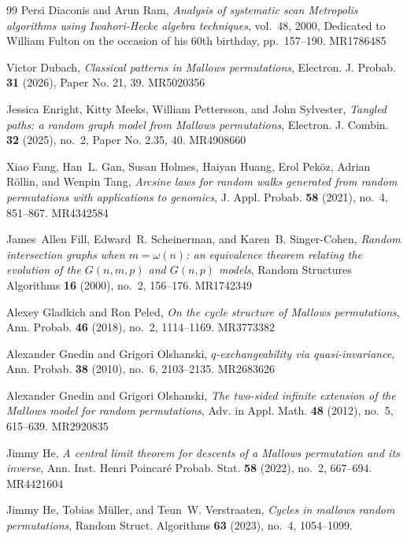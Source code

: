 \documentclass[letterpaper,11pt]{article}
\theoremstyle{definition}
\theoremstyle{remark}
\begin{document}
\begin{thebibliography}{99}
	Persi Diaconis and Arun Ram, \emph{Analysis of systematic scan {M}etropolis
		algorithms using {I}wahori-{H}ecke algebra techniques}, vol.~48, 2000,
	Dedicated to William Fulton on the occasion of his 60th birthday,
	pp.~157--190. MR{1786485}
	
	Victor Dubach, \emph{Classical patterns in {M}allows permutations}, Electron.
	J. Probab. \textbf{31} (2026), Paper No. 21, 39. MR{5020356}
	
	Jessica Enright, Kitty Meeks, William Pettersson, and John Sylvester,
	\emph{Tangled paths: a random graph model from {M}allows permutations},
	Electron. J. Combin. \textbf{32} (2025), no.~2, Paper No. 2.35, 40.
	MR{4908660}
	
	Xiao Fang, Han~L. Gan, Susan Holmes, Haiyan Huang, Erol Pek\"{o}z, Adrian
	R\"{o}llin, and Wenpin Tang, \emph{Arcsine laws for random walks generated
		from random permutations with applications to genomics}, J. Appl. Probab.
	\textbf{58} (2021), no.~4, 851--867. MR{4342584}
	
	James~Allen Fill, Edward~R. Scheinerman, and Karen~B. Singer-Cohen,
	\emph{Random intersection graphs when {$m=\omega(n)$}: an equivalence theorem
		relating the evolution of the {$G(n,m,p)$} and {$G(n,p)$} models}, Random
	Structures Algorithms \textbf{16} (2000), no.~2, 156--176. MR{1742349}
	
	Alexey Gladkich and Ron Peled, \emph{On the cycle structure of {M}allows
		permutations}, Ann. Probab. \textbf{46} (2018), no.~2, 1114--1169.
	MR{3773382}
	
	Alexander Gnedin and Grigori Olshanski, \emph{{$q$}-exchangeability via
		quasi-invariance}, Ann. Probab. \textbf{38} (2010), no.~6, 2103--2135.
	MR{2683626}
	
	Alexander Gnedin and Grigori Olshanski, \emph{The two-sided infinite extension of the {M}allows model for
		random permutations}, Adv. in Appl. Math. \textbf{48} (2012), no.~5,
	615--639. MR{2920835}
	
	Jimmy He, \emph{A central limit theorem for descents of a {M}allows permutation
		and its inverse}, Ann. Inst. Henri Poincar\'{e} Probab. Stat. \textbf{58}
	(2022), no.~2, 667--694. MR{4421604}
	
	Jimmy He, Tobias M{\"{u}}ller, and Teun~W. Verstraaten, \emph{Cycles in mallows
		random permutations}, Random Struct. Algorithms \textbf{63} (2023), no.~4,
	1054--1099.
	

\end{thebibliography}
\end{document}
